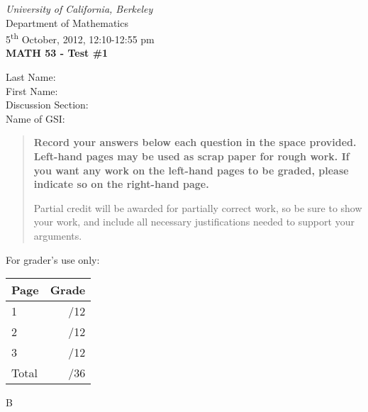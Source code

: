 \documentclass[12pt]{article}
\newcommand{\skipline}{\vspace{12pt}}
\begin{document}
\author{Instructor: Sean Fitzpatrick}
\thispagestyle{plain}
\begin{center}
\emph{University of California, Berkeley}\\
Department of Mathematics\\
5\textsuperscript{th} October, 2012, 12:10-12:55 pm\\
{\bf MATH 53 - Test \#1}\\
\end{center}
\skipline \skipline \skipline \noindent \skipline
Last Name:\underline{\hspace{350pt}}\\
\skipline
First Name:\underline{\hspace{348pt}}\\
\skipline
Discussion Section: \underline{\hspace{307pt}}\\
\skipline
Name of GSI: \underline{\hspace{336pt}}\\


\vspace{0.5in}


\begin{quote}
 {\bf Record your answers below each question in the space provided.    Left-hand pages may be used as scrap paper for rough work.  If you want any work on the left-hand pages to be graded, please indicate so on the right-hand page.
 
 \bigskip
 
Partial credit will be awarded for partially correct work, so be sure to show your work, and include all necessary justifications needed to support your arguments.}
\end{quote}


\vspace{0.5in}

For grader's use only:

\begin{table}[hbt]
\begin{center}
\begin{tabular}{|l|r|} \hline
Page&Grade\\
\hline \hline
\cline{1-2} 1 & \enspace\enspace\enspace\enspace\enspace\enspace/12\\
\cline{1-2} 2 & \enspace\enspace\enspace\enspace\enspace\enspace/12\\
\cline{1-2} 3 & \enspace\enspace\enspace\enspace\enspace\enspace/12\\
\cline{1-2} Total & \enspace\enspace\enspace\enspace\enspace\enspace/36\\
\hline
\end{tabular}

\skipline

\skipline

\skipline

\skipline

B
\end{center}
\end{table}
\newpage
\end{document}
